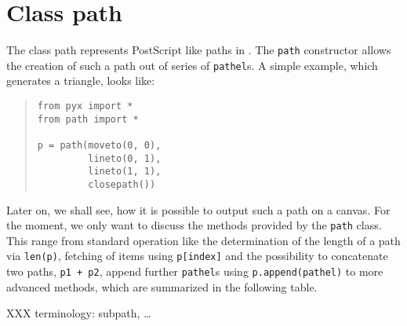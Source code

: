 \section{Class path}

The class path represents PostScript like paths in \PyX. The \verb|path| constructor allows the 
creation of such a path out of series of \verb|pathel|s. A simple example, which generates a triangle,
looks like:
\begin{quote}
\begin{verbatim}
from pyx import *
from path import *

p = path(moveto(0, 0), 
         lineto(0, 1),
         lineto(1, 1),
         closepath())
\end{verbatim}
\end{quote}
Later on, we shall see, how it is possible to output such a path on a
canvas. For the moment, we only want to discuss the methods provided
by the \verb|path| class. This range from standard operation like the
determination of the length of a path via \verb|len(p)|, fetching of
items using \verb|p[index]| and the possibility to concatenate two
paths, \verb|p1 + p2|, append further \verb|pathel|s using
\verb|p.append(pathel)| to more advanced methods, which are summarized
in the following table.

XXX terminology: subpath, \dots


